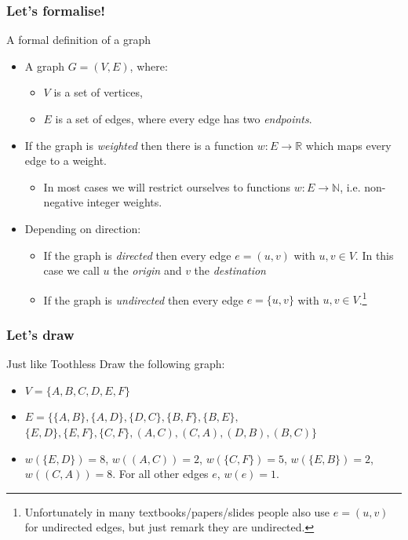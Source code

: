 \begin{frame}
	\frametitle{Let's formalise!}

		\begin{block}{A formal definition of a graph}
			\begin{itemize}
				\item A graph $G=(V,E)$, where:
					\begin{itemize}
						\item $V$ is a set of vertices,
						\item $E$ is a set of edges, where every edge has two \textit{endpoints}.
					\end{itemize}
					\pause
				\item If the graph is \textit{weighted} then there is a function $w: E \to \mathbb{R}$ which maps every edge to
					a weight.
					\pause
					\begin{itemize}
						\item In most cases we will restrict ourselves to functions $w: E \to \mathbb{N}$, i.e. non-negative integer weights.
					\end{itemize}
					\pause
				\item Depending on direction:
					\begin{itemize}
					\pause
						\item If the graph is \textit{directed} then every edge $e = (u,v)$ with $u,v \in V$. In this case we call
							$u$ the \textit{origin} and $v$ the \textit{destination}
					\pause
				\item If the graph is \textit{undirected} then every edge $e = \{u,v\}$ with $u,v \in V$.\footnote{Unfortunately
						in many textbooks/papers/slides people also use $e=(u,v)$ for undirected edges, but just remark they are
					undirected.}
					\end{itemize}
			\end{itemize}
		\end{block}	
\end{frame}

\begin{frame}
	\frametitle{Let's draw}

	\begin{block}{Just like Toothless}
		Draw the following graph:
		\begin{itemize}
			\item $V = \{A,B,C,D,E,F\}$\\
			\item	$E = \{
			\{A, B\},
			\{A, D\},
			\{D, C\},
			\{B, F\},
			\{B, E\},$\\$
			\{E, D\},
			\{E, F\},
			\{C, F\},
			(A,C),
			(C,A),
			(D,B),
			(B,C)
		\}$\\
	\item $w(\{E,D\}) = 8$, $w((A,C)) = 2$, $w(\{C,F\}) = 5$, $w(\{E,B\}) = 2$, $w((C,A)) = 8$.
		For all other edges $e$, $w(e) = 1$.
		\end{itemize}
	\end{block}
\end{frame}

